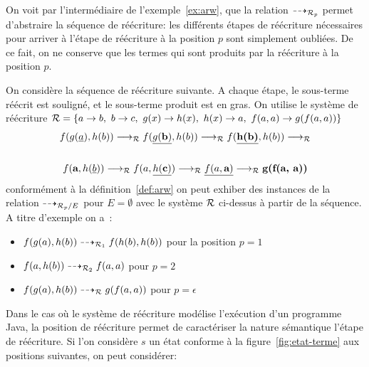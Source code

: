 On voit par l'intermédiaire de l'exemple~\ref{ex:arw}, que la relation $\dashrightarrow_{\mathcal R_p}$ permet 
d'abstraire la séquence de réécriture: les différents étapes de réécriture nécessaires
pour arriver à l'étape de réécriture à la position $p$ sont simplement oubliées.
De ce fait, on ne conserve que les termes qui sont produits par la réécriture à la position $p$.
\begin{example}
  \label{ex:arw}
  On considère la séquence de réécriture suivante. A chaque étape, le
  sous-terme réécrit est souligné, et le sous-terme produit est en
  gras. On utilise le système de réécriture $\mathcal R = \{ a \rightarrow b,\ b \rightarrow c,\ g(x) \rightarrow h(x),\ h(x) \rightarrow a,\ f(a, a)\rightarrow g(f(a,a))\}$
  \begin{multline*}
    f(g(\underline{a}), h(b)) \lrw_\R 
    f(\underline{g(\textbf{b})}, h(b)) \lrw_\R 
    f(\underline{\textbf{h(b)}}, h(b)) \lrw_\R
    \\
    \\
    f(\textbf{a}, h(\underline{b})) \lrw_\R 
    f(a, \underline{h(\textbf{c})}) \lrw_\R 
    \underline{f(a, \textbf{a})} \lrw_\R 
    \textbf{g(f(a, a))} %
  \end{multline*}
  conformément à la définition~\ref{def:arw} on peut exhiber des instances de la relation $\dashrightarrow_{\mathcal R_p/E}$
  pour $E= \emptyset$ avec le système $\mathcal R$ ci-dessus à partir de la séquence. 
  A titre d'exemple on a~:
  \medskip
  \begin{itemize}
  \item $f(g(a), h(b)) \dashrightarrow_{\mathcal R_1} f(h(b), h(b))$ pour la position $p = 1$
  \item $f(a, h(b)) \dashrightarrow_{\mathcal R_2} f(a, a)$ pour $p = 2$ 
  \item $f(g(a), h(b)) \dashrightarrow_\mathcal R g(f(a,a))$ pour $p = \epsilon$ 
  \end{itemize}
\end{example}

Dans le cas où le système de réécriture modélise l'exécution d'un programme Java, la position de réécriture
permet de caractériser la nature sémantique l'étape de réécriture.
Si l'on considère $s$ un état conforme à la figure~\ref{fig:etat-terme} aux positions suivantes, on peut considérer:

